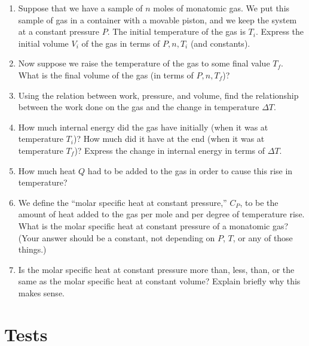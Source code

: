 \documentclass{article}
\begin{document}
\begin{enumerate}

\item Suppose that we have a sample of $n$ moles of monatomic gas.
We put this sample of gas in a container with a movable
piston, and we keep the system at a constant pressure $P$.  The initial
temperature of the gas is $T_i$.  Express the initial volume $V_i$ of 
the gas in terms of $P,n,T_i$ (and constants).  

\vskip 1in

\item Now suppose we raise the temperature of the gas to some final value
$T_f$.  What is the final volume of the gas (in terms of $P,n,T_f$)?

\vskip 1in

\item Using the relation between work, pressure, and volume, find
the relationship between the work done on the gas and the change in temperature
$\Delta T$.

\vfil\eject

\item How much internal energy did the gas have initially (when it
was at temperature $T_i$)?  How much did it have at the end (when
it was at temperature $T_f$)?  Express the change in internal energy
in terms of $\Delta T$.

\vskip 1.5in

\item How much heat $Q$ had to be added to the gas in order to cause
this rise in temperature?  

\vskip 1.5in

\item We define the ``molar specific heat at constant pressure,''
$C_P$, to be the amount of heat added to the gas per mole and per
degree of temperature rise.  What is the molar specific heat at
constant pressure of a monatomic gas?  (Your answer should be a
constant, not depending on $P$, $T$, or any of those things.)

\vskip 1.5in

\item Is the molar specific heat at constant pressure more than, less, than, or
the same as the molar specific heat at constant volume?  Explain
briefly why this makes sense.


\vskip 1.5in

\end{enumerate}

\section{Tests}
\end{document}
